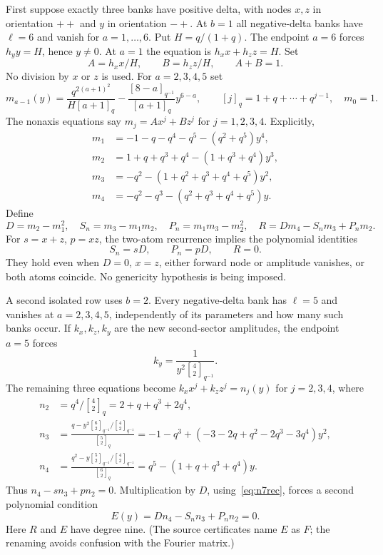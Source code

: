 \documentclass[11pt,letterpaper]{article}
\theoremstyle{definition}\newtheorem{definition}[theorem]{Definition}
\newcommand{\gb}[3]{\genfrac{[}{]}{0pt}{}{#1}{#2}_{#3}}
\begin{document}
First suppose exactly three banks have positive delta, with nodes $x,z$ in orientation $++$ and $y$ in orientation $-+$. At $b=1$ all negative-delta banks have $\ell=6$ and vanish for $a=1,\ldots,6$. Put $H=q/(1+q)$. The endpoint $a=6$ forces $h_y y=H$, hence $y\ne0$. At $a=1$ the equation is $h_xx+h_zz=H$. Set
\[
 A=h_xx/H,\qquad B=h_zz/H,\qquad A+B=1.
\]
No division by $x$ or $z$ is used. For $a=2,3,4,5$ set
\[
 m_{a-1}(y)=\frac{q^{2(a+1)^2}}{H[a+1]_q}
   -\frac{[8-a]_{q^{-1}}}{[a+1]_q}y^{6-a},
 \qquad [j]_q=1+q+\cdots+q^{j-1},\quad m_0=1.
\]
The nonaxis equations say $m_j=Ax^j+Bz^j$ for $j=1,2,3,4$. Explicitly,
\begin{align*}
 m_1&=-1-q-q^4-q^5-(q^2+q^5)y^4,\\
 m_2&=1+q+q^3+q^4-(1+q^3+q^4)y^3,\\
 m_3&=-q^2-(1+q^2+q^3+q^4+q^5)y^2,\\
 m_4&=-q^2-q^3-(q^2+q^3+q^4+q^5)y.
\end{align*}
Define
\begin{equation}\label{eq:n7DF}
 D=m_2-m_1^2,\quad S_n=m_3-m_1m_2,\quad
 P_n=m_1m_3-m_2^2,\quad R=Dm_4-S_nm_3+P_nm_2.
\end{equation}
For $s=x+z$, $p=xz$, the two-atom recurrence implies the polynomial identities
\begin{equation}\label{eq:n7rec}
 S_n=sD,\qquad P_n=pD,\qquad R=0.
\end{equation}
They hold even when $D=0$, $x=z$, either forward node or amplitude vanishes, or both atoms coincide. No genericity hypothesis is being imposed.

A second isolated row uses $b=2$. Every negative-delta bank has $\ell=5$ and vanishes at $a=2,3,4,5$, independently of its parameters and how many such banks occur. If $k_x,k_z,k_y$ are the new second-sector amplitudes, the endpoint $a=5$ forces
\[
 k_y=\frac1{y^2\gb42{q^{-1}}}.
\]
The remaining three equations become $k_xx^j+k_zz^j=n_j(y)$ for $j=2,3,4$, where
\begin{align*}
 n_2&=q^4/\gb42q=2+q+q^3+2q^4,\\
 n_3&=\frac{q-y^2\gb62{q^{-1}}/\gb42{q^{-1}}}{\gb52q}
      =-1-q^3+(-3-2q+q^2-2q^3-3q^4)y^2,\\
 n_4&=\frac{q^2-y\gb52{q^{-1}}/\gb42{q^{-1}}}{\gb62q}
      =q^5-(1+q+q^3+q^4)y.
\end{align*}
Thus $n_4-sn_3+pn_2=0$. Multiplication by $D$, using~\eqref{eq:n7rec}, forces a second polynomial condition
\begin{equation}\label{eq:n7F}
 E(y)=Dn_4-S_nn_3+P_nn_2=0.
\end{equation}
Here $R$ and $E$ have degree nine. (The source certificates name $E$ as $F$; the renaming avoids confusion with the Fourier matrix.)
\end{document}
